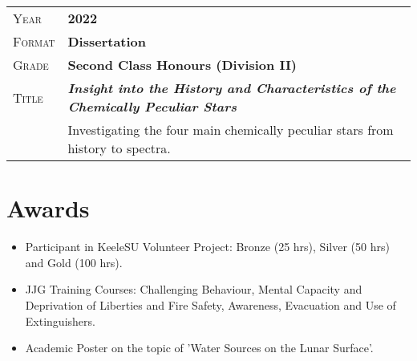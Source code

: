 \documentclass[a4paper, oneside, final]{scrartcl} %
\newcommand{\gray}{\rowcolor[gray]{.90}} %
\begin{document}
\begin{center}
\vspace{12pt}

\begin{tabularx}{0.97\linewidth}{>{\raggedleft\scshape}p{2cm}X}
	\gray Year & \textbf{2022}\\
	\gray Format & \textbf{Dissertation}\\
	\gray Grade & \textbf{Second Class Honours (Division II)}\\
	\gray Title & \textbf{\textit{Insight into the History and Characteristics of the Chemically Peculiar Stars}}\\
	& Investigating the four main chemically peculiar stars from history to spectra.
\end{tabularx}

\vspace{12pt}


\section{Awards}

\begin{itemize}
	\item Participant in KeeleSU Volunteer Project: Bronze (25 hrs), Silver (50 hrs) and Gold (100 hrs).
	\item JJG Training Courses: Challenging Behaviour, Mental Capacity and Deprivation of Liberties and Fire Safety, Awareness, Evacuation and Use of Extinguishers.
	\item Academic Poster on the topic of 'Water Sources on the Lunar Surface'.
\end{itemize}


\end{center}
\end{document}
